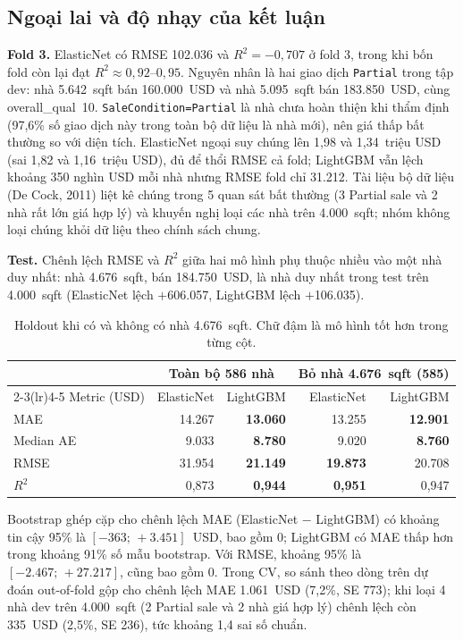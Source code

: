 \subsection{Ngoại lai và độ nhạy của kết luận}
\label{subsec:sensitivity}

\textbf{Fold 3.} ElasticNet có RMSE 102.036 và $R^2=-0{,}707$ ở fold 3, trong khi bốn fold còn lại đạt
$R^2\approx0{,}92$--$0{,}95$. Nguyên nhân là hai giao dịch \texttt{Partial} trong tập dev: nhà 5.642~sqft bán
160.000~USD và nhà 5.095~sqft bán 183.850~USD, cùng overall\_qual~10. \texttt{SaleCondition=Partial} là nhà chưa
hoàn thiện khi thẩm định (97,6\% số giao dịch này trong toàn bộ dữ liệu là nhà mới), nên giá thấp bất thường so với
diện tích. ElasticNet ngoại suy chúng lên 1,98 và 1,34~triệu USD (sai 1,82 và 1,16~triệu USD), đủ để thổi RMSE cả
fold; LightGBM vẫn lệch khoảng 350 nghìn USD mỗi nhà nhưng RMSE fold chỉ 31.212. Tài liệu bộ dữ liệu (De Cock,
2011) liệt kê chúng trong 5 quan sát bất thường (3 Partial sale và 2 nhà rất lớn giá hợp lý) và khuyến nghị loại
các nhà trên 4.000~sqft; nhóm không loại chúng khỏi dữ liệu theo chính sách chung.

\textbf{Test.} Chênh lệch RMSE và $R^2$ giữa hai mô hình phụ thuộc nhiều vào một nhà duy nhất: nhà 4.676~sqft, bán
184.750~USD, là nhà duy nhất trong test trên 4.000~sqft (ElasticNet lệch $+$606.057, LightGBM lệch $+$106.035).

\begin{table}[H]
\centering
\begin{tabular}{lrrrr}
\toprule
 & \multicolumn{2}{c}{Toàn bộ 586 nhà} & \multicolumn{2}{c}{Bỏ nhà 4.676~sqft (585)} \\
\cmidrule(lr){2-3}\cmidrule(lr){4-5}
Metric (USD) & ElasticNet & LightGBM & ElasticNet & LightGBM \\
\midrule
MAE & 14.267 & \textbf{13.060} & 13.255 & \textbf{12.901} \\
Median AE & 9.033 & \textbf{8.780} & 9.020 & \textbf{8.760} \\
RMSE & 31.954 & \textbf{21.149} & \textbf{19.873} & 20.708 \\
$R^2$ & 0,873 & \textbf{0,944} & \textbf{0,951} & 0,947 \\
\bottomrule
\end{tabular}
\caption{Holdout khi có và không có nhà 4.676~sqft. Chữ đậm là mô hình tốt hơn trong từng cột.}
\end{table}

Bootstrap ghép cặp cho chênh lệch MAE (ElasticNet $-$ LightGBM) có khoảng tin cậy 95\% là $[-363;\,+3.451]$~USD,
bao gồm 0; LightGBM có MAE thấp hơn trong khoảng 91\% số mẫu bootstrap. Với RMSE, khoảng 95\% là
$[-2.467;\,+27.217]$, cũng bao gồm 0. Trong CV, so sánh theo dòng trên dự đoán out-of-fold gộp cho chênh lệch MAE
1.061~USD (7,2\%, SE 773); khi loại 4 nhà dev trên 4.000~sqft (2 Partial sale và 2 nhà giá hợp lý) chênh lệch còn
335~USD (2,5\%, SE 236), tức khoảng 1,4 sai số chuẩn.

